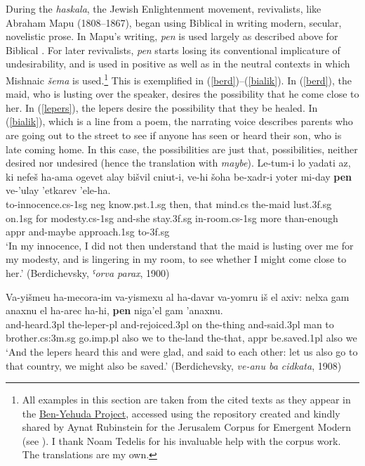 \documentclass[output=paper,colorlinks,citecolor=brown]{langscibook}
\begin{document}
During the \textit{haskala}, the Jewish Enlightenment movement,  revivalists, like Abraham Mapu (1808--1867), began using Biblical  in writing modern, secular, novelistic prose. In Mapu's writing, \textit{pen} is used largely as described above for Biblical . For later revivalists, \textit{pen} starts losing its conventional implicature of undesirability, and is used in positive as well as in the neutral contexts in which Mishnaic \textit{šema} is used.\footnote{All examples in this section are taken from the cited texts as they appear in the \href{https://benyehuda.org/}{Ben-Yehuda Project}, accessed using the repository created and kindly shared by Aynat Rubinstein for the Jerusalem Corpus for Emergent Modern  (see \citealt{rubinstein19}). I thank Noam Tedelis for his invaluable help with the corpus work. The translations are my own.} This is exemplified in (\ref{berd})--(\ref{bialik}). In (\ref{berd}), the maid, who is lusting over the speaker, desires the possibility that he come close to her. In (\ref{lepers}), the lepers desire the possibility that they be healed. In (\ref{bialik}), which is a line from a poem, the narrating voice describes parents who are going out to the street to see if anyone has seen or heard their son, who is late coming home. In this case, the possibilities are just that, possibilities, neither desired nor undesired (hence the translation with \textit{maybe}).
\ea
\label{berd}
\gll  Le-tum-i lo yadati az, ki nefeš ha-ama ogevet alay bišvil cniut-i, ve-hi šoha be-xadr-i yoter mi-day \textbf{pen} ve-'ulay 'etkarev 'ele-ha. \\
to-innocence.{\sc cs-1sg} {\sc neg} know.{\sc pst.1.sg} then, that mind.{\sc cs}  the-maid lust.{\sc 3f.sg} on.{\sc 1sg} for modesty.{\sc cs-1sg} and-she stay.{\sc 3f.sg} in-room.{\sc cs-1sg} more than-enough {\sc appr}  and-maybe approach.{\sc 1sg} to-{\sc 3f.sg} \\
\glt  `In my innocence, I did not then understand that the maid is lusting over me for my modesty, and is lingering in my room, to see whether I might come close to her.' (Berdichevsky, \textit{ˤorva parax}, 1900)
\z

\ea
\label{lepers} 
\gll Va-yišmeu ha-mecora-im va-yismexu al ha-davar va-yomru iš el axiv: nelxa gam anaxnu el ha-arec ha-hi, \textbf{pen} niga'el gam 'anaxnu.\\
and-heard.{\sc 3pl} the-leper-{\sc pl} and-rejoiced.{\sc 3pl} on the-thing and-said.{\sc 3pl} man to brother.{\sc cs:3m.sg} go.{\sc imp.pl} also we to the-land the-that, {\sc appr} be.saved.{\sc 1pl} also we\\
\glt  `And the lepers heard this and were glad, and said to each other: let us also go to that country, we might also be saved.' (Berdichevsky, \textit{ve-anu ba cidkata}, 1908)
\z
\end{document}
